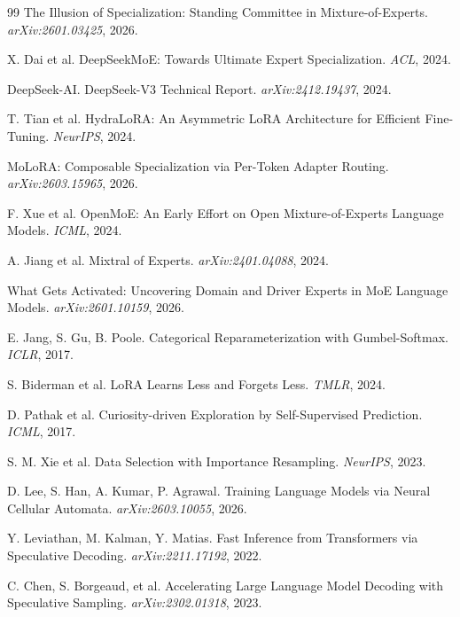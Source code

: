 \documentclass{article}
\begin{document}
\begin{thebibliography}{99}
 The Illusion of Specialization: Standing Committee in Mixture-of-Experts. \textit{arXiv:2601.03425}, 2026.

 X. Dai et al. DeepSeekMoE: Towards Ultimate Expert Specialization. \textit{ACL}, 2024.

 DeepSeek-AI. DeepSeek-V3 Technical Report. \textit{arXiv:2412.19437}, 2024.

 T. Tian et al. HydraLoRA: An Asymmetric LoRA Architecture for Efficient Fine-Tuning. \textit{NeurIPS}, 2024.

 MoLoRA: Composable Specialization via Per-Token Adapter Routing. \textit{arXiv:2603.15965}, 2026.

 F. Xue et al. OpenMoE: An Early Effort on Open Mixture-of-Experts Language Models. \textit{ICML}, 2024.

 A. Jiang et al. Mixtral of Experts. \textit{arXiv:2401.04088}, 2024.

 What Gets Activated: Uncovering Domain and Driver Experts in MoE Language Models. \textit{arXiv:2601.10159}, 2026.

 E. Jang, S. Gu, B. Poole. Categorical Reparameterization with Gumbel-Softmax. \textit{ICLR}, 2017.

 S. Biderman et al. LoRA Learns Less and Forgets Less. \textit{TMLR}, 2024.

 D. Pathak et al. Curiosity-driven Exploration by Self-Supervised Prediction. \textit{ICML}, 2017.

 S. M. Xie et al. Data Selection with Importance Resampling. \textit{NeurIPS}, 2023.

 D. Lee, S. Han, A. Kumar, P. Agrawal. Training Language Models via Neural Cellular Automata. \textit{arXiv:2603.10055}, 2026.

 Y. Leviathan, M. Kalman, Y. Matias. Fast Inference from Transformers via Speculative Decoding. \textit{arXiv:2211.17192}, 2022.

 C. Chen, S. Borgeaud, et al. Accelerating Large Language Model Decoding with Speculative Sampling. \textit{arXiv:2302.01318}, 2023.

\end{thebibliography}

\appendix
\end{document}
